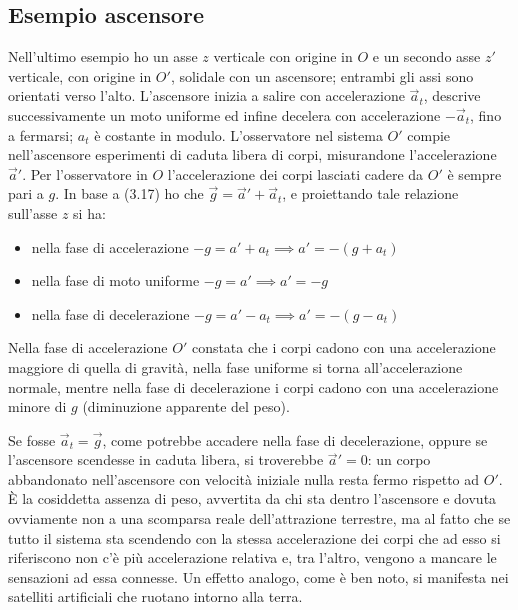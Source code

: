 \documentclass[class=book, crop=false, oneside, 12pt]{standalone}
\begin{document}
\subsection{Esempio ascensore}

Nell'ultimo esempio ho un asse \(z\) verticale con origine in \(O\) e un secondo asse \(z'\) verticale, con origine in \(O'\), solidale con un ascensore; 
entrambi gli assi sono orientati verso l'alto. 
L'ascensore inizia a salire con accelerazione \(\overrightarrow{a}_t\), descrive successivamente un moto uniforme ed infine decelera con accelerazione \(-\overrightarrow{a}_t\), fino a fermarsi; \(a_t\) è costante in modulo.
L'osservatore nel sistema \(O'\) compie nell'ascensore esperimenti di caduta libera di corpi, misurandone l'accelerazione \(\overrightarrow{a}'\).
Per l'osservatore in \(O\) l'accelerazione dei corpi lasciati cadere da \(O'\) è sempre pari a \(g\). 
In base a (3.17) ho che \(\overrightarrow{g} =\overrightarrow{a}'+ \overrightarrow{a}_t\), e proiettando tale relazione sull'asse \(z\) si ha:
\begin{itemize}
    \item nella fase di accelerazione \(-g = a' + a_t \implies a' = -(g + a_t)\)
    \item nella fase di moto uniforme \(-g = a' \implies a' = -g\)
    \item nella fase di decelerazione \(-g = a' - a_t \implies a' = -(g-a_t)\) 
\end{itemize}
Nella fase di accelerazione \(O'\) constata che i corpi cadono con una accelerazione maggiore di quella di gravità,
nella fase uniforme si torna all'accelerazione normale, mentre nella fase di decelerazione i corpi cadono con una accelerazione minore di \(g\) (diminuzione apparente del peso).

Se fosse \(\overrightarrow{a}_t = \overrightarrow{g}\), come potrebbe accadere nella fase di decelerazione, oppure se l'ascensore scendesse in caduta libera, si troverebbe \(\overrightarrow{a}'= 0\): 
un corpo abbandonato nell'ascensore con velocità iniziale nulla resta fermo rispetto ad \(O'\). 
È la cosiddetta assenza di peso, avvertita da chi sta dentro l'ascensore e dovuta ovviamente non a una scomparsa reale dell'attrazione terrestre, ma al fatto che se tutto il sistema sta scendendo con la stessa accelerazione dei corpi che ad esso si riferiscono non c'è più accelerazione relativa e, tra l'altro, vengono a mancare le sensazioni ad essa connesse. 
Un effetto analogo, come è ben noto, si manifesta nei satelliti artificiali che ruotano intorno alla terra.
\end{document}
